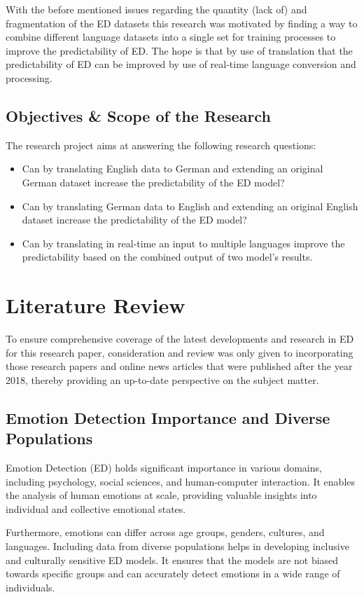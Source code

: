\documentclass[11pt]{article}
\begin{document}
With the before mentioned issues regarding the quantity (lack of) and fragmentation of the ED datasets this research was motivated by finding a way to combine different language datasets into a single set for training processes to improve the predictability of ED. The hope is that by use of translation that the predictability of ED can be improved by use of real-time language conversion and processing.

\subsection{Objectives \& Scope of the Research}

The research project aims at answering the following research questions:

\begin{itemize}
\item Can by translating English data to German and extending an original German dataset increase the predictability of the ED model?
\item Can by translating German data to English and extending an original English dataset increase the predictability of the ED model?
\item Can by translating in real-time an input to multiple languages improve the predictability based on the combined output of two model's results.
\end{itemize}


\section{Literature Review}
To ensure comprehensive coverage of the latest developments and research in ED for this research paper, consideration and review was only given to incorporating those research papers and online news articles that were published after the year 2018, thereby providing an up-to-date perspective on the subject matter.

\subsection{Emotion Detection Importance and Diverse Populations}
Emotion Detection (ED) holds significant importance in various domains, including psychology, social sciences, and human-computer interaction. It enables the analysis of human emotions at scale, providing valuable insights into individual and collective emotional states.

Furthermore, emotions can differ across age groups, genders, cultures, and languages. Including data from diverse populations helps in developing inclusive and culturally sensitive ED models. It ensures that the models are not biased towards specific groups and can accurately detect emotions in a wide range of individuals.
\end{document}
